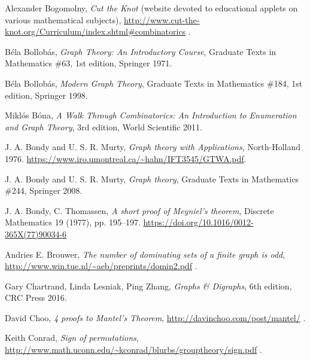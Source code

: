 \documentclass[numbers=enddot,12pt,final,onecolumn,notitlepage]{scrartcl}%
\theoremstyle{definition}
\begin{document}
\begin{thebibliography}{9999999999}
Alexander Bogomolny,
\textit{Cut the Knot} (website devoted to educational applets on
various mathematical subjects),
\url{http://www.cut-the-knot.org/Curriculum/index.shtml#combinatorics} .

B\'ela Bollob\'as,
\textit{Graph Theory: An Introductory Course},
Graduate Texts in Mathematics \#63, 1st edition, Springer 1971.

B\'ela Bollob\'as,
\textit{Modern Graph Theory},
Graduate Texts in Mathematics \#184, 1st edition, Springer 1998.

Mikl\'os B\'ona,
\textit{A Walk Through Combinatorics:
An Introduction to Enumeration and Graph Theory},
3rd edition, World Scientific 2011.

J. A. Bondy and U. S. R. Murty, \textit{Graph theory with Applications},
North-Holland 1976.
\newline \url{https://www.iro.umontreal.ca/~hahn/IFT3545/GTWA.pdf}.

J. A. Bondy and U. S. R. Murty, \textit{Graph theory}, Graduate Texts
in Mathematics \#244, Springer 2008.

J. A. Bondy, C. Thomassen,
\textit{A short proof of Meyniel's theorem},
Discrete Mathematics 19 (1977), pp. 195--197.
\newline \url{https://doi.org/10.1016/0012-365X(77)90034-6}

Andries E. Brouwer,
\textit{The number of dominating sets of a finite graph is odd},
\url{http://www.win.tue.nl/~aeb/preprints/domin2.pdf} .


Gary Chartrand, Linda Lesniak, Ping Zhang,
\textit{Graphs \& Digraphs}, 6th edition, CRC Press 2016.

David Choo,
\textit{4 proofs to Mantel's Theorem},
\url{http://davinchoo.com/post/mantel/} .

Keith Conrad, \textit{Sign of permutations},
\newline\url{http://www.math.uconn.edu/~kconrad/blurbs/grouptheory/sign.pdf} .


\end{thebibliography}
\end{document}
